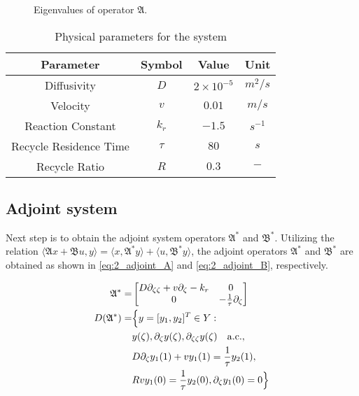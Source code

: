 \begin{figure}[!htbp]
    \centering
    
    \caption{Eigenvalues of operator $\mathfrak{A}$.}
    \label{fig:2_eigval_dist}
\end{figure}


\begin{table}[ht]
    \centering
    \caption{Physical parameters for the system}
    \label{tab:2_pars}
    \begin{tabular}{|c|c|c|c|}
    \hline
    \textbf{Parameter}        & \textbf{Symbol} & \textbf{Value}     & \textbf{Unit}    \\ \hline
    Diffusivity               & $D$             & $2\times10^{-5}$   & ${m^2}/{s}$      \\ \hline
    Velocity                  & $v$             & $0.01$   & ${m}/{s}$        \\ \hline
    Reaction Constant         & $k_r$           & $-1.5$             & $s^{-1}$         \\ \hline
    Recycle Residence Time    & $\tau$          & $80$               & $s$              \\ \hline
    Recycle Ratio             & $R$             & $0.3$              & $-$              \\ \hline
    \end{tabular}
\end{table}

\subsection{Adjoint system}

Next step is to obtain the adjoint system operators $\mathfrak{A}^*$ and $\mathfrak{B}^*$. Utilizing the relation $\langle \mathfrak{A} {x} + \mathfrak{B} u, {y}\rangle = \langle {x}, \mathfrak{A}^* {y}\rangle + \langle u, \mathfrak{B}^* {y}\rangle$, the adjoint operators $\mathfrak{A}^*$ and $\mathfrak{B}^*$ are obtained as shown in \eqref{eq:2_adjoint_A} and \eqref{eq:2_adjoint_B}, respectively.


\begin{equation} \label{eq:2_adjoint_A}
    \begin{aligned}
        {\mathfrak{A}}^{*} =&
        \begin{bmatrix}
            D \partial_{\zeta \zeta} + v \partial_\zeta - k_r & 0\\
            0 & -\frac{1}{\tau} \partial_\zeta
        \end{bmatrix}\\
        D(\mathfrak{A}^*) =& \Bigl\{ {y} = [y_1, y_2]^T \in Y:\\
        &{y}(\zeta), \partial_\zeta {y}(\zeta), \partial_{\zeta \zeta} {y}(\zeta) \quad \mathrm{a.c.},\\
        &D \partial_\zeta y_1(1) + v y_1(1) = \frac{1}{\tau} y_2(1), \\
        &R v y_1(0) = \frac{1}{\tau} y_2(0), 
        \partial_\zeta y_1(0) = 0 \Bigr\}
    \end{aligned}
\end{equation}

